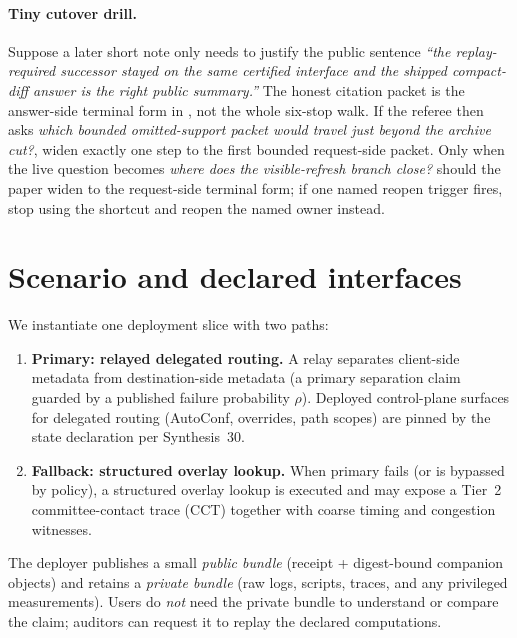 \documentclass[11pt]{article}
\begin{document}
\paragraph{Tiny cutover drill.}
Suppose a later short note only needs to justify the public sentence \emph{``the replay-required successor stayed on the same certified interface and the shipped compact-diff answer is the right public summary.''} The honest citation packet is the answer-side terminal form in , not the whole six-stop walk. If the referee then asks \emph{which bounded omitted-support packet would travel just beyond the archive cut?}, widen exactly one step to the first bounded request-side packet. Only when the live question becomes \emph{where does the visible-refresh branch close?} should the paper widen to the request-side terminal form; if one named reopen trigger fires, stop using the shortcut and reopen the named owner instead.

\section{Scenario and declared interfaces}
\label{sec:scenario}
We instantiate one deployment slice with two paths:
\begin{enumerate}[leftmargin=*]
\item \textbf{Primary: relayed delegated routing.} A relay separates client-side metadata from destination-side metadata (a primary separation claim guarded by a published failure probability $\rho$). Deployed control-plane surfaces for delegated routing (AutoConf, overrides, path scopes) are pinned by the state declaration per Synthesis~30.\cite{series:primarysepmanifest,series:deployedsurfaces}
\item \textbf{Fallback: structured overlay lookup.} When primary fails (or is bypassed by policy), a structured overlay lookup is executed and may expose a Tier~2 committee-contact trace (CCT) together with coarse timing and congestion witnesses.\cite{series:traceifaces,series:tieredobs}
\end{enumerate}
The deployer publishes a small \emph{public bundle} (receipt + digest-bound companion objects) and retains a \emph{private bundle} (raw logs, scripts, traces, and any privileged measurements).
Users do \emph{not} need the private bundle to understand or compare the claim; auditors can request it to replay the declared computations.\cite{series:auditorreplay}
\end{document}
